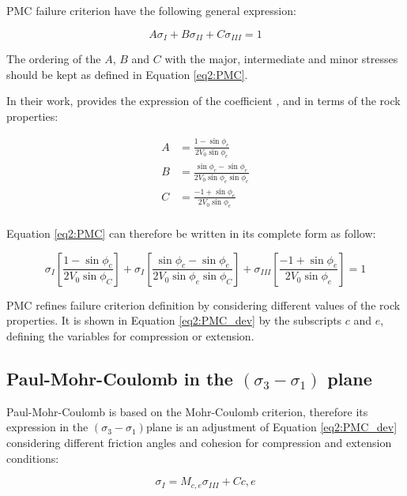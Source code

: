 PMC failure criterion have the following general expression:

\begin{equation}\label{eq2:PMC}
    A\sigma_I + B\sigma_{II}+C\sigma_{III} = 1
\end{equation}

The ordering of the $A$, $B$ and $C$ with the major, intermediate and minor stresses should be kept as defined in Equation \ref{eq2:PMC}. 

In their work, \cite[Meyer and Labuz (2013)]{Meyer2013} provides the expression of the coefficient ,  and  in terms of the rock properties:

\begin{align}\label{pmc_coeff}
    A &= \frac{1-\sin \phi_c}{2V_0\sin \phi_c} \\
    B &= \frac{\sin \phi_c - \sin \phi_e}{2V_0 \sin \phi_e \sin \phi_c} \\
    C &= \frac{-1+\sin \phi_e}{2V_0\sin \phi_e} \\
\end{align}

Equation \ref{eq2:PMC} can therefore be written in its complete form as follow:

\begin{equation}\label{eq2:PMC_dev}
    \sigma_{I}\left[\frac{1-\sin \phi_{c}}{2 V_{0} \sin \phi_{C}}\right]+\sigma_{I}\left[\frac{\sin \phi_{c}-\sin \phi_{e}}{2 V_{0} \sin \phi_{e} \sin \phi_{C}}\right]+\sigma_{I I I}\left[\frac{-1+\sin \phi_{e}}{2 V_{0} \sin \phi_{e}}\right]=1
\end{equation}

PMC refines failure criterion definition by considering different values of the rock properties.  It is shown in Equation \ref{eq2:PMC_dev} by the subscripts $c$ and $e$, defining the variables for compression or extension.

\subsection{Paul-Mohr-Coulomb in the \texorpdfstring{$(\sigma_3 -\sigma_1)$}{sigma 3 - sigma 1} plane}\label{ch2:PMCsig1sig3}

Paul-Mohr-Coulomb is based on the Mohr-Coulomb criterion, therefore its expression in the  $(\sigma_3 -\sigma_1)$plane is an adjustment of Equation \ref{eq2:PMC_dev} considering different friction angles and cohesion for compression and extension conditions: 

\begin{equation}\label{eq2:PMC_sig1sig3}
    \sigma_I = M_{c,e}\sigma_{III}+C{c,e}
\end{equation}

